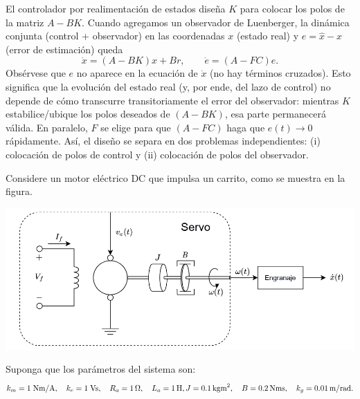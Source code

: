 \documentclass[
  11pt,
  letterpaper,
   addpoints,
  answers
  ]{exam}
\begin{document}
\begin{questions}
\begin{solution}
   El controlador por realimentación de estados diseña $K$ para colocar los polos de la matriz $A-BK$. Cuando agregamos un observador de Luenberger, la dinámica conjunta (control + observador) en las coordenadas $x$ (estado real) y $e = \hat x - x$ (error de estimación) queda
  \[
     \dot x = (A-BK)x + Br, \qquad \dot e = (A-FC)e.
  \]
  Obsérvese que $e$ no aparece en la ecuación de $\dot x$ (no hay términos cruzados). Esto significa que la evolución del estado real (y, por ende, del lazo de control) no depende de cómo transcurre transitoriamente el error del observador: mientras $K$ estabilice/ubique los polos deseados de $(A-BK)$, esa parte permanecerá válida. En paralelo, $F$ se elige para que $(A-FC)$ haga que $e(t)\to 0$ rápidamente. Así, el diseño se separa en dos problemas independientes: (i) colocación de polos de control y (ii) colocación de polos del observador.

  \end{solution}
  \question Considere un motor eléctrico DC que impulsa un carrito, como se muestra en la figura.
  \begin{center}
    \includegraphics[width=.75\textwidth]{../figures/Auxiliar_4_4.png}
  \end{center}
  Suponga que los parámetros del sistema son:
  \[
     k_m = 1\;\text{Nm/A},\quad k_e = 1\;\text{Vs},\quad R_a = 1\,\Omega,\quad L_a = 1\,\text{H},        \\
     J = 0.1\,\text{kgm}^2,\quad B = 0.2\,\text{Nms}, \quad k_g = 0.01\,\text{m/rad}.
  \]
\end{questions}
\end{document}
